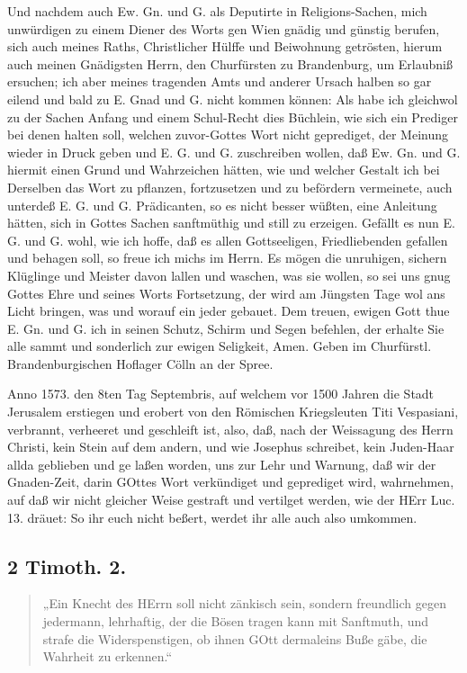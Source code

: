 Und nachdem auch Ew. Gn. und G. als Deputirte in Religions-Sachen, mich unwürdigen zu einem Diener des Worts gen Wien gnädig und günstig berufen, sich auch meines Raths, Christlicher Hülffe und Beiwohnung getrösten, hierum auch meinen Gnädigsten Herrn, den Churfürsten zu Brandenburg, um Erlaubniß ersuchen; ich aber meines tragenden Amts und anderer Ursach halben so gar eilend und bald zu E.
Gnad und G. nicht kommen können: Als habe ich gleichwol zu der Sachen Anfang und einem Schul-Recht dies Büchlein, wie sich ein Prediger bei denen halten soll, welchen zuvor-Gottes Wort nicht geprediget, der Meinung wieder in Druck geben und E. G. und G. zuschreiben wollen, daß Ew. Gn. und G. hiermit einen Grund und Wahrzeichen hätten, wie und welcher Gestalt ich bei Derselben das Wort zu pflanzen, fortzusetzen und zu befördern vermeinete, auch unterdeß E. G. und G. Prädicanten, so es nicht besser wüßten, eine Anleitung hätten, sich in Gottes Sachen sanftmüthig und still zu erzeigen. Gefällt es nun E. G. und G. wohl, wie ich hoffe, daß es allen Gottseeligen, Friedliebenden gefallen und behagen soll, so freue ich michs im Herrn. Es mögen die unruhigen, sichern Klüglinge und Meister davon lallen und waschen, was sie wollen, so sei uns gnug Gottes Ehre und seines Worts Fortsetzung, der wird am Jüngsten Tage wol ans Licht bringen, was und worauf ein jeder gebauet. Dem treuen, ewigen Gott thue E. Gn. und G. ich in seinen Schutz, Schirm und Segen befehlen, der erhalte Sie alle sammt und sonderlich zur ewigen Seligkeit, Amen. Geben im Churfürstl. Brandenburgischen Hoflager Cölln an der Spree.

Anno 1573. den 8ten Tag Septembris, auf welchem vor 1500 Jahren die Stadt Jerusalem erstiegen und erobert von den Römischen Kriegsleuten Titi Vespasiani, verbrannt, verheeret und geschleift ist, also, daß, nach der Weissagung des Herrn Christi, kein Stein auf dem andern, und wie Josephus schreibet, kein Juden-Haar allda geblieben und ge%
laßen worden, uns zur Lehr und Warnung, daß wir der Gnaden-Zeit, darin GOttes Wort verkündiget und geprediget wird, wahrnehmen, auf daß wir nicht gleicher Weise gestraft und vertilget werden, wie der HErr Luc. 13. dräuet: So ihr euch nicht beßert, werdet ihr alle auch also umkommen.

\subsection*{2 Timoth. 2.}

\begin{quote}
„Ein Knecht des HErrn soll nicht zänkisch sein, sondern freundlich gegen jedermann, lehrhaftig, der die Bösen tragen kann mit Sanftmuth, und strafe die Widerspenstigen, ob ihnen GOtt dermaleins Buße gäbe, die Wahrheit zu erkennen.“
\end{quote}


